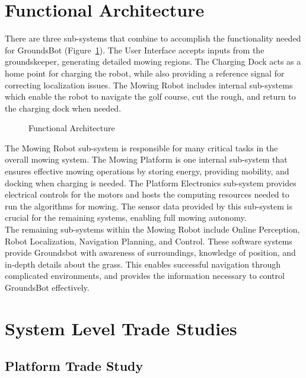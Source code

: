 \documentclass{article}
\begin{document}
\section{Functional Architecture}
  There are three sub-systems that combine to accomplish the functionality needed for GroundsBot (Figure~\ref{fig:functional}). The User Interface accepts inputs from the groundskeeper, generating detailed mowing regions. The Charging Dock acts as a home point for charging the robot, while also providing a reference signal for correcting localization issues. The Mowing Robot includes internal sub-systems which enable the robot to navigate the golf course, cut the rough, and return to the charging dock when needed.\\
  
\begin{figure}[H]
\centering
\def\svgwidth{\columnwidth}

\caption{Functional Architecture}
\label{fig:functional}
\end{figure}

  The Mowing Robot sub-system is responsible for many critical tasks in the overall mowing system. The Mowing Platform is one internal sub-system that ensures effective mowing operations by storing energy, providing mobility, and docking when charging is needed. The Platform Electronics sub-system provides electrical controls for the motors and hosts the computing resources needed to run the algorithms for mowing. The sensor data provided by this sub-system is crucial for the remaining systems, enabling full mowing autonomy.\\
  
  The remaining sub-systems within the Mowing Robot include Online Perception, Robot Localization, Navigation Planning, and Control. These software systems provide Groundsbot with awareness of surroundings, knowledge of position, and in-depth details about the grass. This enables successful navigation through complicated environments, and provides the information necessary to control GroundsBot effectively.\\

\section{System Level Trade Studies}
	\subsection{Platform Trade Study}
	
\end{document}

